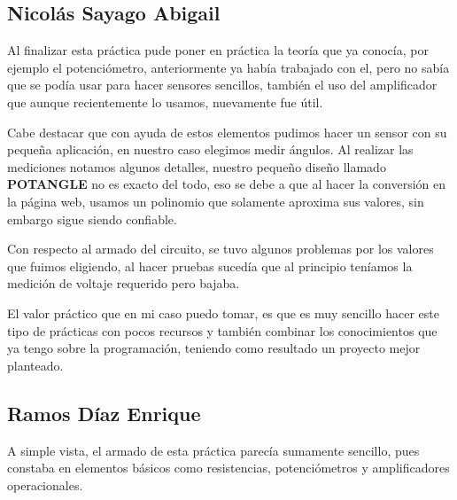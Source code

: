 \documentclass[12pt]{article}
\begin{document}
		\subsection{Nicolás Sayago Abigail}
    Al finalizar esta práctica pude poner en práctica la teoría que ya conocía, por ejemplo el potenciómetro, anteriormente ya había trabajado con el, pero no sabía que se podía usar para hacer sensores sencillos, también el uso del amplificador que aunque recientemente lo usamos, nuevamente fue útil. 
    
    Cabe destacar que con ayuda de estos elementos pudimos hacer un sensor con su pequeña aplicación, en nuestro caso elegimos medir ángulos. Al realizar las mediciones notamos algunos detalles, nuestro pequeño diseño llamado \textbf{POTANGLE} no es exacto del todo, eso se debe a que al hacer la conversión en la página web, usamos un polinomio que solamente aproxima sus valores, sin embargo sigue siendo confiable. 
    
    Con respecto al armado del circuito, se tuvo algunos problemas por los valores que fuimos eligiendo, al hacer pruebas sucedía que al principio teníamos la medición de voltaje requerido pero bajaba.
    
    El valor práctico que en mi caso puedo tomar, es que es muy sencillo hacer este tipo de prácticas con pocos recursos y también combinar los conocimientos que ya tengo sobre la programación, teniendo como resultado un proyecto mejor planteado.
    
    
		\subsection{Ramos Díaz Enrique}
		A simple vista, el armado de esta práctica parecía sumamente sencillo, pues constaba en elementos básicos como resistencias, potenciómetros y amplificadores operacionales.
		
\end{document}
